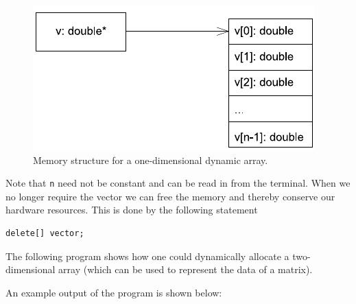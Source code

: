   \begin{figure}[htb]
    \begin{center}  
      \includegraphics{BasicCPP/Figures/DynamicArray1D.pdf}
    \end{center}  
    \caption{Memory structure for a one-dimensional dynamic array.
             \label{figDynamicArray1D}} 
  \end{figure}


Note that \verb+n+ need not be constant and can be read in from the terminal. When we
no longer require the vector we can free the memory and thereby conserve our
hardware resources. This is done by the following statement
{\small \begin{verbatim}
delete[] vector;
\end{verbatim}}

The following program shows how one could dynamically allocate a two-dimensional
array (which can be used to represent the data of a matrix).

\noindent {\small }

An example output of the program is shown below:


